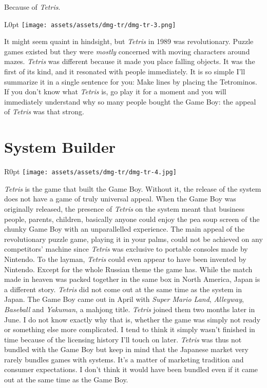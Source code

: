 \documentclass{book}
\begin{document}
Because of \emph{Tetris}.

\begin{wrapfigure}{L}{0pt} \texttt{[image: assets/assets/dmg-tr/dmg-tr-3.png]}\end{wrapfigure}
It might seem quaint in hindsight, but \emph{Tetris} in 1989 was revolutionary. Puzzle games existed but they were \emph{mostly} concerned with moving characters around mazes. \emph{Tetris} was different because it made you place falling objects. It was the first of its kind, and it resonated with people immediately. It is so simple I’ll summarize it in a single sentence for you: Make lines by placing the Tetrominos. If you don’t know what \emph{Tetris} is, go play it for a moment and you will immediately understand why so many people bought the Game Boy: the appeal of \emph{Tetris} was that strong.

\FloatBarrier\needspace{5pt}\section*{System Builder}\nopagebreak[4]

\begin{wrapfigure}{R}{0pt} \texttt{[image: assets/assets/dmg-tr/dmg-tr-4.jpg]}\end{wrapfigure}
\emph{Tetris} is the game that built the Game Boy. Without it, the release of the system does not have a game of truly universal appeal. When the Game Boy was originally released, the presence of \emph{Tetris} on the system meant that business people, parents, children, basically anyone could enjoy the pea soup screen of the chunky Game Boy with an unparallelled experience. The main appeal of the revolutionary puzzle game, playing it in your palms, could not be achieved on any competitors’ machine since \emph{Tetris} was exclusive to portable consoles made by Nintendo. To the layman, \emph{Tetris} could even appear to have been invented by Nintendo. Except for the whole Russian theme the game has. While the match made in heaven was packed together in the same box in North America, Japan is a different story. \emph{Tetris} did not come out at the same time as the system in Japan. The Game Boy came out in April with \emph{Super Mario Land}, \emph{Alleyway}, \emph{Baseball} and \emph{Yakuman}, a mahjong title. \emph{Tetris} joined them two months later in June. I do not know exactly why that is, whether the game was simply not ready or something else more complicated. I tend to think it simply wasn’t finished in time because of the licensing history I’ll touch on later. \emph{Tetris} was thus not bundled with the Game Boy but keep in mind that the Japanese market very rarely bundles games with systems. It’s a matter of marketing tradition and consumer expectations. I don’t think it would have been bundled even if it came out at the same time as the Game Boy.
\end{document}

